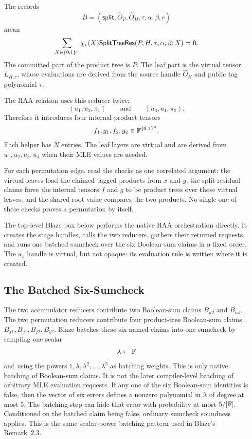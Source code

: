 The records
\[
  B=(\mathsf{split},\widehat O_P,\widehat O_H,\tau,\alpha,\beta,r)
\]
mean
\[
  \sum_{X\in\{0,1\}^n}\chi_r(X)
  \mathsf{SplitTreeRes}(P,H,\tau,\alpha,\beta;X)=0.
\]
The committed part of the product tree is \(P\).  The leaf part is the virtual
tensor \(L_{H,\tau}\), whose evaluations are derived from the source handle
\(\widehat O_H\) and public tag polynomial \(\tau\).

The RAA relation uses this reducer twice:
\[
  (u_1,u_2,\pi_1)
  \qquad\text{and}\qquad
  (u_3,u_4,\pi_2).
\]
Therefore it introduces four internal product tensors
\[
  f_1,g_1,f_2,g_2\in\mathbb{F}^{\{0,1\}^n}.
\]
Each helper has \(N\) entries.  The leaf layers are virtual and are derived
from \(u_1,u_2,u_3,u_4\) when their MLE values are needed.

For each permutation edge, read the checks as one correlated argument: the
virtual leaves load the claimed tagged products from \(x\) and \(y\), the
split residual claims force the internal tensors \(f\) and \(g\) to be
product trees over those virtual leaves, and the shared root value compares the
two products.  No single one of these checks proves a permutation by itself.

The top-level Blaze box below performs the native RAA orchestration directly.
It creates the stage handles, calls the two reducers, gathers their returned
requests, and runs one batched sumcheck over the six Boolean-sum claims in a
fixed order.  The \(u_1\) handle is virtual, but not opaque: its evaluation
rule is written where it is created.

\subsection{The Batched Six-Sumcheck}

The two accumulator reducers contribute two Boolean-sum claims \(B_{u2}\) and
\(B_{u4}\).  The two permutation reducers contribute four product-tree
Boolean-sum claims \(B_{f1},B_{g1},B_{f2},B_{g2}\).  Blaze batches these six
named claims into
one sumcheck by sampling one scalar
\[
  \lambda\leftarrow\mathbb{F}
\]
and using the powers \(1,\lambda,\lambda^2,\ldots,\lambda^5\) as batching
weights.
This is only native batching of Boolean-sum claims.  It is not the later
compiler-level batching of arbitrary MLE evaluation requests.  If any one of
the six Boolean-sum identities is false, then the vector of six errors defines
a nonzero polynomial in \(\lambda\) of degree at most \(5\).  The batching step
can hide that error with probability at most \(5/|\mathbb{F}|\).  Conditioned on the
batched claim being false, ordinary sumcheck soundness applies.  This is the
same scalar-power batching pattern used in Blaze's Remark~2.3.

